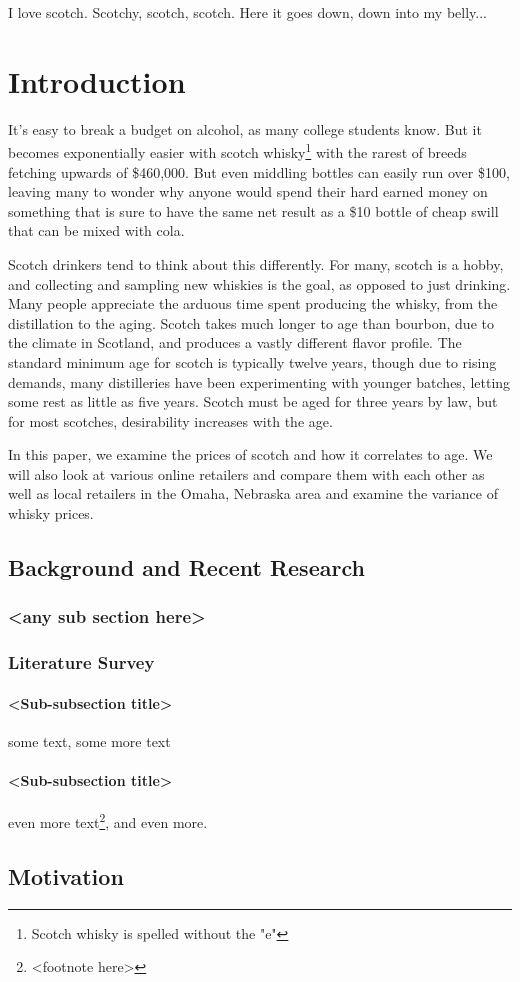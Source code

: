 
\begin{savequote}[45mm]
I love scotch. Scotchy, scotch, scotch. Here it goes down, down into my belly... 
\end{savequote}

\chapter{Introduction}

It's easy to break a budget on alcohol, as many college students know. But it becomes exponentially easier with scotch whisky\footnote{Scotch whisky is spelled without the "e"} with the rarest of breeds fetching upwards of \$460,000.\cite{Macallan64} But even middling bottles can easily run over \$100, leaving many to wonder why anyone would spend their hard earned money on something that is sure to have the same net result as a \$10 bottle of cheap swill that can be mixed with cola.

Scotch drinkers tend to think about this differently. For many, scotch is a hobby, and collecting and sampling new whiskies is the goal, as opposed to just drinking. Many people appreciate the arduous time spent producing the whisky, from the distillation to the aging. Scotch takes much longer to age than bourbon, due to the climate in Scotland, and produces a vastly different flavor profile. The standard minimum age for scotch is typically twelve years, though due to rising demands, many distilleries have been experimenting with younger batches, letting some rest as little as five years. Scotch must be aged for three years by law, but for most scotches, desirability increases with the age.

In this paper, we examine the prices of scotch and how it correlates to age. We will also look at various online retailers and compare them with each other as well as local retailers in the Omaha, Nebraska area and examine the variance of whisky prices.


\section{Background and Recent Research}
\subsection{<any sub section here>}

\subsection{Literature Survey}

\subsubsection{<Sub-subsection title>}
some text\cite{citation-1-name-here}, some more text

\subsubsection{<Sub-subsection title>}
even more text\footnote{<footnote here>}, and even more.

\section{Motivation}


